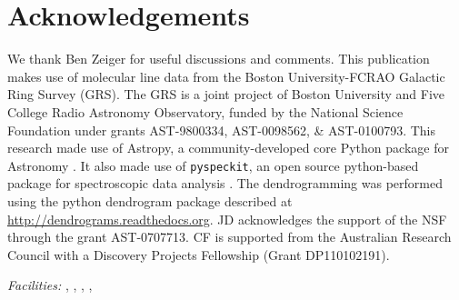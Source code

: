 \section{Acknowledgements}
We thank Ben Zeiger for useful discussions and comments.
This publication makes use of molecular line data from the Boston
University-FCRAO Galactic Ring Survey (GRS). The GRS is a joint project of
Boston University and Five College Radio Astronomy Observatory, funded by the
National Science Foundation under grants AST-9800334, AST-0098562, \&
AST-0100793.
This research made use of Astropy, a community-developed core Python package
for Astronomy \citep{Astropy2013a}.  It also made use of \texttt{pyspeckit}, an
open source python-based package for spectroscopic data analysis
\citep[\url{http://pyspeckit.bitbucket.org}; ][]{Ginsburg2011c}.
The dendrogramming was performed using the python dendrogram package described at
\url{http://dendrograms.readthedocs.org}.
JD acknowledges the support of the NSF through the grant AST-0707713.
CF is supported from the Australian Research Council with a Discovery Projects Fellowship (Grant DP110102191).



{\it Facilities:} , , ,
, 



% 
% 

